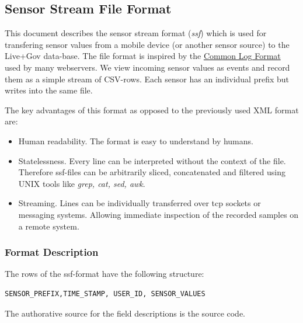 \subsection{Sensor Stream File Format}\label{sec:ssf}
This document describes the sensor stream format ({\it ssf}) which is used for
transfering sensor values from a mobile device (or another sensor
source) to the Live+Gov data-base. The file format is inspired by the
\href{http://en.wikipedia.org/wiki/Common\_Log\_Format}{Common Log
  Format} used by many webservers. We view incoming sensor values as
events and record them as a simple stream of CSV-rows. Each sensor has
an individual prefix but writes into the same file.

The key advantages of this format as opposed to the previously used
XML format are:
\begin{itemize}
\item Human readability. The format is easy to understand by humans.
\item Statelessness. Every line can be interpreted without the context
  of the file. Therefore ssf-files can be arbitrarily sliced,
  concatenated and filtered using UNIX tools like {\it grep, cat, sed,
    awk}.
\item Streaming. Lines can be individually transferred over tcp
  sockets or messaging systems. Allowing immediate inspection of the
  recorded samples on a remote system.
\end{itemize}

\subsubsection*{Format Description}

The rows of the ssf-format have the following structure:
\small
\begin{verbatim}
SENSOR_PREFIX,TIME_STAMP, USER_ID, SENSOR_VALUES
\end{verbatim}
\normalsize


The authorative source for the field descriptions is the source code.


